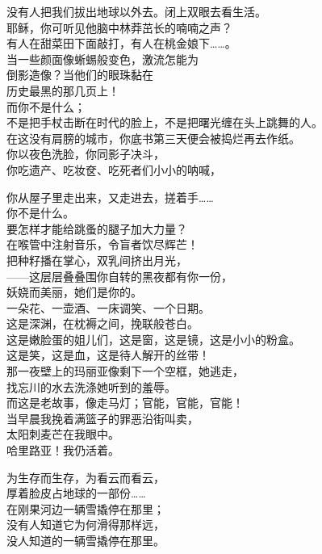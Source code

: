 \documentclass{article}
\begin{document}
没有人把我们拔出地球以外去。闭上双眼去看生活。\\
耶稣，你可听见他脑中林莽茁长的喃喃之声？\\
有人在甜菜田下面敲打，有人在桃金娘下……。\\
当一些颜面像蜥蜴般变色，激流怎能为\\
倒影造像？当他们的眼珠黏在
\\
历史最黑的那几页上！ \\ 


而你不是什么；\\
不是把手杖击断在时代的脸上，不是把曙光缠在头上跳舞的人。\\
在这没有肩膀的城市，你底书第三天便会被捣烂再去作纸。\\
你以夜色洗脸，你同影子决斗，\\
你吃遗产、吃妆奁、吃死者们小小的呐喊，\\
\newpage

你从屋子里走出来，又走进去，搓着手……
\\
你不是什么。 \\ 


要怎样才能给跳蚤的腿子加大力量？\\
在喉管中注射音乐，令盲者饮尽辉芒！\\
把种籽播在掌心，双乳间挤出月光，\\
——这层层叠叠围你自转的黑夜都有你一份，\\
妖娆而美丽，她们是你的。
\\
一朵花、一壶酒、一床调笑、一个日期。 \\ 


这是深渊，在枕褥之间，挽联般苍白。\\
这是嫩脸蛋的姐儿们，这是窗，这是镜，这是小小的粉盒。\\
这是笑，这是血，这是待人解开的丝带！\\
那一夜壁上的玛丽亚像剩下一个空框，她逃走，\\
找忘川的水去洗涤她听到的羞辱。\\
而这是老故事，像走马灯；官能，官能，官能！\\
当早晨我挽着满篮子的罪恶沿街叫卖，
\\
太阳刺麦芒在我眼中。 \\ 


哈里路亚！我仍活着。\\
\newpage

为生存而生存，为看云而看云，\\
厚着脸皮占地球的一部份……\\
在刚果河边一辆雪撬停在那里；\\
没有人知道它为何滑得那样远，\\
没人知道的一辆雪撬停在那里。
\end{document}
